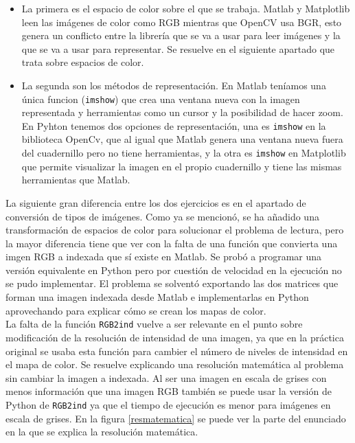 \begin{itemize}
\item La primera es el espacio de color sobre el que se trabaja. Matlab y Matplotlib leen las imágenes de color como RGB mientras que OpenCV usa BGR, esto genera un conflicto entre la librería que se va a usar para leer imágenes y la que se va a usar para representar. Se resuelve en el siguiente apartado que trata sobre espacios de color.\\

\item La segunda son los métodos de representación. En Matlab teníamos una única funcion (\texttt{imshow}) que crea una ventana nueva con la imagen representada y herramientas como un cursor y la posibilidad de hacer zoom. En Pyhton tenemos dos opciones de representación, una es \texttt{imshow} en la biblioteca  OpenCv, que al igual que Matlab genera una ventana nueva fuera del cuadernillo pero no tiene herramientas, y la otra es \texttt{imshow} en Matplotlib que permite visualizar la imagen en el propio cuadernillo y tiene las mismas herramientas que Matlab.\\
\end{itemize}

La siguiente gran diferencia entre los dos ejercicios es en el apartado de conversión de tipos de imágenes. Como ya se mencionó, se ha añadido una transformación de espacios de color para solucionar el problema de lectura, pero la mayor diferencia tiene que ver con la falta de una función que convierta una imgen RGB a indexada que sí existe en Matlab. Se probó a programar una versión equivalente en Python pero por cuestión de velocidad en la ejecución no se pudo implementar. El problema se solventó exportando las dos matrices que forman una imagen indexada desde Matlab  e implementarlas en Python aprovechando para explicar cómo se crean los mapas de color.\\

La falta de la función \texttt{RGB2ind} vuelve a ser relevante en el punto sobre modificación de la resolución de intensidad de una imagen, ya que en la práctica original se usaba esta función para cambier el número de niveles de intensidad en el mapa de color. Se resuelve explicando una resolución matemática al problema sin cambiar la imagen a indexada. Al ser una imagen en escala de grises con menos información que una imagen RGB también se puede usar la versión de Python de \texttt{RGB2ind} ya que el tiempo de ejecución es menor para imágenes en escala de grises. En la figura \ref{resmatematica} se puede ver la parte del enunciado en la que se explica la resolución matemática. 

